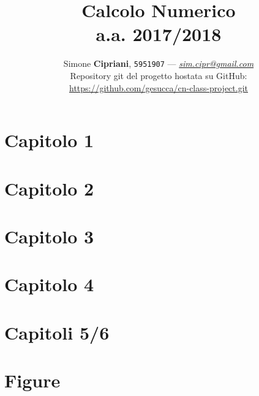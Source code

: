 \documentclass[a4paper]{article}
\date{}
\begin{document}
\title{
	\vspace{3cm}
	\textbf{Calcolo Numerico}
	\\
	a.a. 2017/2018
	\vspace{1.5cm}
}

\author{
	Simone \textbf{Cipriani}, \texttt{5951907} --- \href{mailto:sim.cipr@gmail.com}{\textit{sim.cipr@gmail.com}}
	\vspace{1cm}
	\\
	Repository git del progetto hostata su GitHub:
	\\
	\url{https://github.com/gesucca/cn-class-project.git}
}

\maketitle
\newpage
\tableofcontents


\newpage
\section{\textbf{Capitolo 1}}


\newpage
\section{\textbf{Capitolo 2}}
%

\newpage
\section{\textbf{Capitolo 3}}
%

\newpage
\section{\textbf{Capitolo 4}}
%

\newpage
\section{\textbf{Capitoli 5/6}}
%
\newpage
{}
\section{\textbf{Figure}}
%
\end{document}
